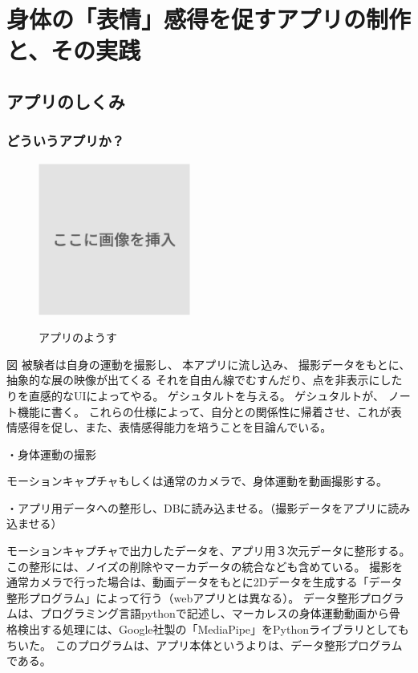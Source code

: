 \part{身体の「表情」感得を促すアプリの制作と、その実践}
\setcounter{chapter}{0} %
\chapter{アプリのしくみ}

\section{どういうアプリか？}
\begin{figure}[h]
  \centering
  \caption{アプリのようす}  
  \includegraphics[width=5cm]{images/dummy.png}
  \label{fig:アプリのようす}
\end{figure}
図
被験者は自身の運動を撮影し、
本アプリに流し込み、
撮影データをもとに、
抽象的な展の映像が出てくる
それを自由ん線でむすんだり、点を非表示にしたりを直感的なUIによってやる。
ゲシュタルトを与える。
ゲシュタルトが、
ノート機能に書く。
これらの仕様によって、自分との関係性に帰着させ、これが表情感得を促し、また、表情感得能力を培うことを目論んでいる。

・身体運動の撮影

モーションキャプチャもしくは通常のカメラで、身体運動を動画撮影する。



・アプリ用データへの整形し、DBに読み込ませる。（撮影データをアプリに読み込ませる）

モーションキャプチャで出力したデータを、アプリ用３次元データに整形する。この整形には、ノイズの削除やマーカデータの統合なども含めている。
撮影を通常カメラで行った場合は、動画データをもとに2Dデータを生成する「データ整形プログラム」によって行う（webアプリとは異なる）。
データ整形プログラムは、プログラミング言語pythonで記述し、マーカレスの身体運動動画から骨格検出する処理には、Google社製の「MediaPipe」\cite{mediapipe}をPythonライブラリとしてもちいた。
このプログラムは、アプリ本体というよりは、データ整形プログラムである。

